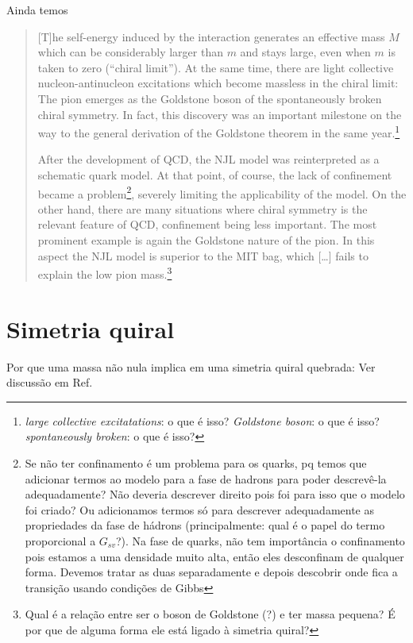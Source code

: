 Ainda temos\cite{Buballa}
\begin{quote}
[T]he self-energy induced by the interaction generates an effective mass $M$ which can be considerably larger than $m$ and stays large, even when $m$ is taken to zero (``chiral limit''). At the same time, there are light collective nucleon-antinucleon excitations which become massless in the chiral limit: The pion emerges as the Goldstone boson of the spontaneously broken chiral symmetry. In fact, this discovery was an important milestone on the way to the general derivation of the Goldstone theorem in the same year.\footnote{\emph{large collective excitatations}: o que é isso? \emph{Goldstone boson}: o que é isso? \emph{spontaneously broken}: o que é isso?}

After the development of QCD, the NJL model was reinterpreted as a schematic quark model. At that point, of course, the lack of confinement became a problem\footnote{Se não ter confinamento é um problema para os quarks, pq temos que adicionar termos ao modelo para a fase de hadrons para poder descrevê-la adequadamente? Não deveria descrever direito pois foi para isso que o modelo foi criado? Ou adicionamos termos só para descrever adequadamente as propriedades da fase de hádrons (principalmente: qual é o papel do termo proporcional a $G_{sv}$?). Na fase de quarks, não tem importância o confinamento pois estamos a uma densidade muito alta, então eles desconfinam de qualquer forma. Devemos tratar as duas separadamente e depois descobrir onde fica a transição usando condições de Gibbs}, severely limiting the applicability of the model. On the other hand, there are many situations where chiral symmetry is the relevant feature of QCD, confinement being less important. The most prominent example is again the Goldstone nature of the pion. In this aspect the NJL model is superior to the MIT bag, which [\dots] fails to explain the low pion mass.\footnote{Qual é a relação entre ser o boson de Goldstone (?) e ter massa pequena? É por que de alguma forma ele está ligado à simetria quiral?}
\end{quote}


\section{Simetria quiral}

Por que uma massa não nula implica em uma simetria quiral quebrada: Ver discussão em Ref.\cite{Vogl}

